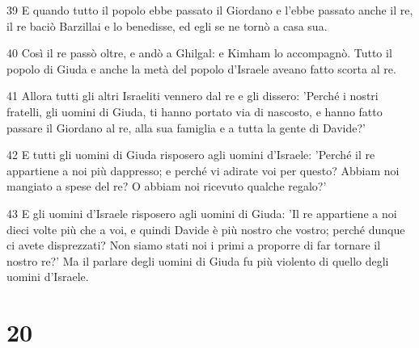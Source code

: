 \par 39 E quando tutto il popolo ebbe passato il Giordano e l'ebbe passato anche il re, il re baciò Barzillai e lo benedisse, ed egli se ne tornò a casa sua.
\par 40 Così il re passò oltre, e andò a Ghilgal: e Kimham lo accompagnò. Tutto il popolo di Giuda e anche la metà del popolo d'Israele aveano fatto scorta al re.
\par 41 Allora tutti gli altri Israeliti vennero dal re e gli dissero: 'Perché i nostri fratelli, gli uomini di Giuda, ti hanno portato via di nascosto, e hanno fatto passare il Giordano al re, alla sua famiglia e a tutta la gente di Davide?'
\par 42 E tutti gli uomini di Giuda risposero agli uomini d'Israele: 'Perché il re appartiene a noi più dappresso; e perché vi adirate voi per questo? Abbiam noi mangiato a spese del re? O abbiam noi ricevuto qualche regalo?'
\par 43 E gli uomini d'Israele risposero agli uomini di Giuda: 'Il re appartiene a noi dieci volte più che a voi, e quindi Davide è più nostro che vostro; perché dunque ci avete disprezzati? Non siamo stati noi i primi a proporre di far tornare il nostro re?' Ma il parlare degli uomini di Giuda fu più violento di quello degli uomini d'Israele.

\chapter{20}

